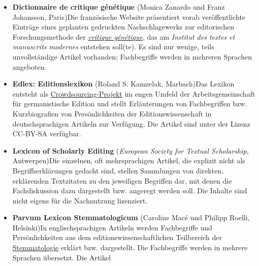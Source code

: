 \documentclass{article}
\begin{document}
        \begin{itemize}\item {\textbf{Dictionnaire de critique génétique}  (Monica Zanardo und
                     Franz Johansson, Paris)Die französische Website präsentiert vorab
                     veröffentlichte Einträge eines geplanten gedruckten Nachschlagewerks zur
                     editorischen Forschungsmethode der \emph{\href{http://gams.uni-graz.at/o:konde.46}{critique génétique}}, das am \emph{Institut des textes et manuscrits modernes}
                     entstehen soll(te). Es sind nur wenige, teils unvollständige Artikel vorhanden;
                     Fachbegriffe werden in mehreren Sprachen angeboten.}\item {\textbf{Edlex: Editionslexikon } (Roland S. Kamzelak, Marbach)Das
                     Lexikon entsteht als \href{http://gams.uni-graz.at/o:konde.47}{Crowdsourcing-Projekt} im engen Umfeld der
                     Arbeitsgemeinschaft für germanistische Edition und stellt Erläuterungen von
                     Fachbegriffen bzw. Kurzbiografien von Persönlichkeiten der Editionswissenschaft
                     in deutschsprachigen Artikeln zur Verfügung. Die Artikel sind unter der Lizenz
                     CC-BY-SA verfügbar.}\item {\textbf{Lexicon of Scholarly Editing}  (\emph{European
                        Society for Textual Scholarship}, Antwerpen)Die einzelnen, oft
                     mehrsprachigen Artikel, die explizit nicht als Begriffserklärungen gedacht
                     sind, stellen Sammlungen von direkten, erklärenden Textzitaten zu den
                     jeweiligen Begriffen dar, mit denen die Fachdiskussion dazu dargestellt bzw.
                     angeregt werden soll. Die Inhalte sind nicht eigens für die Nachnutzung
                     lizenziert.}\item {\textbf{Parvum Lexicon Stemmatologicum}  (Caroline Macé und Philipp
                     Roelli, Helsinki)In englischsprachigen Artikeln werden Fachbegriffe und
                     Persönlichkeiten aus dem editionswissenschaftlichen Teilbereich der \href{http://gams.uni-graz.at/o:konde.172}{Stemmatologie} erklärt bzw.
                     dargestellt. Die Fachbegriffe werden in mehrere Sprachen übersetzt. Die Artikel
}
\end{itemize}
\end{document}
